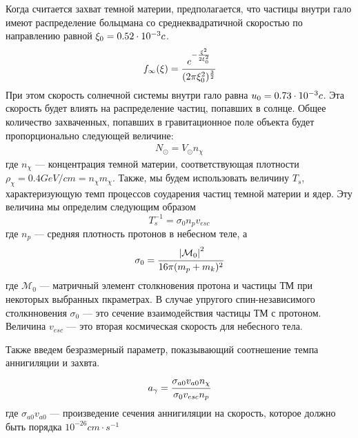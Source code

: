 Когда считается захват темной материи, предполагается, что частицы внутри гало имеют распределение больцмана со среднеквадратичной скоростью по направлению равной $\xi_0 = {0.52}\cdot 10^{-3} c$. 
\begin{equation}
	\label{dens_infty_xi}
	f_{\infty}(\xi)  = 
	\cfrac{e^{-\frac{\xi^2}{2\xi_0^2}}}{(2\pi\xi_0^2)^{\frac{3}{2}}}
\end{equation}
При этом скорость солнечной системы внутри гало равна $u_0 = {0.73}\cdot 10^{-3} c$. Эта скорость будет влиять на распределение частиц, попавших в солнце. Общее количество захваченных, попавших в гравитационное поле объекта будет пропорционально следующей величине:
\begin{eqnarray}
	\label{eq:N_solar}
	N_{\odot} = V_{\odot} n_{\chi}
\end{eqnarray}
где $n_{\chi}$ --- концентрация темной материи, соответствующая плотности $\rho_{\chi} = 0.4 GeV/cm = n_{\chi} m_{\chi}$.
Также, мы будем использовать величину $T_s$, характеризующую темп процессов соударения частиц темной материи и ядер. Эту величина мы определим следующим образом
\begin{equation}
	\label{eq:T_s}
	T_s^{-1} = \sigma_{0} n_p v_{esc}
\end{equation}
где $n_p$ --- средняя плотность протонов в небесном теле, а 
\begin{equation}
	\label{sigma_0}
	\sigma_0 = \cfrac{\left| \mathcal{M}_0 \right|^{2}}{16\pi (m_p+m_k)^2}
\end{equation}
где $\mathcal{M}_0$ --- матричный элемент столкновения протона и частицы ТМ при некоторых
выбранных пкраметрах. В случае упругого спин-независимого столкнновения $\sigma_0$ --- это сечение взаимодействия частицы ТМ с протоном.
Величина $v_{esc}$ --- это вторая космическая скорость для небесного тела.

Также введем безразмерный параметр, показывающий соотнешение темпа аннигиляции и захвта.
\begin{equation}
	\label{eq:a_gamma}
	a_{\gamma} = \cfrac{\sigma_{a0} v_{a0} n_{\chi}}{\sigma_{0} v_{esc} n_p}
\end{equation}
где $\sigma_{a0} v_{a0}$ --- произведение сечения аннигиляции на скорость, которое должно быть порядка $10^{-26} cm \cdot s^{-1}$

